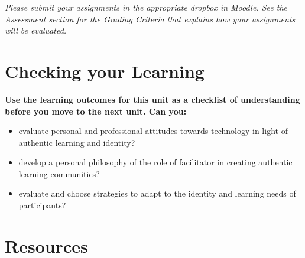 \documentclass[
]{book}
\providecommand{\tightlist}{%
  \setlength{\itemsep}{0pt}\setlength{\parskip}{0pt}}
\begin{document}
\begin{caution}
\emph{Please submit your assignments in the appropriate dropbox in
Moodle. See the Assessment section for the Grading Criteria that
explains how your assignments will be evaluated.}
\end{caution}

\hypertarget{checking-your-learning-5}{%
\section*{Checking your Learning}\label{checking-your-learning-5}}

\begin{progress}
\textbf{Use the learning outcomes for this unit as a checklist of
understanding before you move to the next unit. Can you:}

\begin{itemize}
\tightlist
\item
  evaluate personal and professional attitudes towards technology in
  light of authentic learning and identity?\\
\item
  develop a personal philosophy of the role of facilitator in creating
  authentic learning communities?\\
\item
  evaluate and choose strategies to adapt to the identity and learning
  needs of participants?
\end{itemize}
\end{progress}

\hypertarget{resources}{%
\section*{Resources}\label{resources}}
\end{document}
